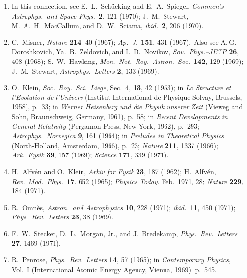 \begin{enumerate}
  \item{}\label{ch15-ref-163}
  In this connection, see E.~L.~Sch\"ucking and E.~A.~Spiegel,
  \emph{Comments Astrophys.\ and Space Phys.}\ \textbf{2}, 121 (1970);
  J.~M.~Stewart, M.~A.~H.~MacCallum, and D.~W.~Sciama,
  \emph{ibid.}\ \textbf{2}, 206 (1970).

  \item{}\label{ch15-ref-164}
  C.~Misner, \emph{Nature} \textbf{214}, 40 (1967);
  \emph{Ap.\ J.}\ \textbf{151}, 431 (1967).\ 
  Also see A.\,G. Doro\-shkovich, Ya.~B.~Zeldovich, and I.~D.~Novikov,
  \emph{Sov.\ Phys.--JETP} \textbf{26}, 408 (1968);
  S.~W.~Hawking, \emph{Mon.\ Not.\ Roy.\ Astron.\ Soc.}\
  \textbf{142}, 129 (1969);
  J.~M.~Stewart, \emph{Astrophys.\ Letters} \textbf{2}, 133 (1969).

  \item\phantomsection\label{ch15-ref-165}
  O.~Klein, \emph{Soc.\ Roy.\ Sci.\ Liege}, Sec.~4, \textbf{13}, 42
  (1953); in \emph{La Structure et l'Evolution de l'Univers}
  (Institut International de Physique Solvay, Brussels, 1958), p.~33;
  in \emph{Werner Heisenberg und die Physik unserer Zeit}
  (Vieweg and Sohn, Braunschweig, Germany, 1961), p.~58;
  in \emph{Recent Developments in General Relativity}
  (Pergamon Press, New York, 1962), p.~293;
  \emph{Astrophys.\ Norvegica} \textbf{9}, 161 (1964);
  in \emph{Preludes in Theoretical Physics}
  (North-Holland, Amsterdam, 1966), p.~23;
  \emph{Nature} \textbf{211}, 1337 (1966);
  \emph{Ark.\ Fysik} \textbf{39}, 157 (1969);
  \emph{Science} \textbf{171}, 339 (1971).

  \item{}\label{ch15-ref-166}
  H.~Alfv\'en and O.~Klein,
  \emph{Arkiv for Fysik} \textbf{23}, 187 (1962);
  H.~Alfv\'en, \emph{Rev.\ Mod.\ Phys.}\ \textbf{17}, 652 (1965);
  \emph{Physics Today}, Feb.\ 1971, 28;
  \emph{Nature} \textbf{229}, 184 (1971).

  \item[166a.]\label{ch15-ref-166a}
  R.~Omn\`es, \emph{Astron.\ and Astrophysics} \textbf{10}, 228 (1971);
  \emph{ibid.}\ \textbf{11}, 450 (1971);
  \emph{Phys.\ Rev.\ Letters} \textbf{23}, 38 (1969).

  \item[166b.]\label{ch15-ref-166b}
  F.~W.~Stecker, D.~L.~Morgan, Jr., and J.~Bredekamp,
  \emph{Phys.\ Rev.\ Letters} \textbf{27}, 1469 (1971).

  \item{}\label{ch15-ref-167}
  R.~Penrose, \emph{Phys.\ Rev.\ Letters} \textbf{14}, 57 (1965);
  in \emph{Contemporary Physics}, Vol.~I
  (International Atomic Energy Agency, Vienna, 1969), p.~545.


\end{enumerate}
